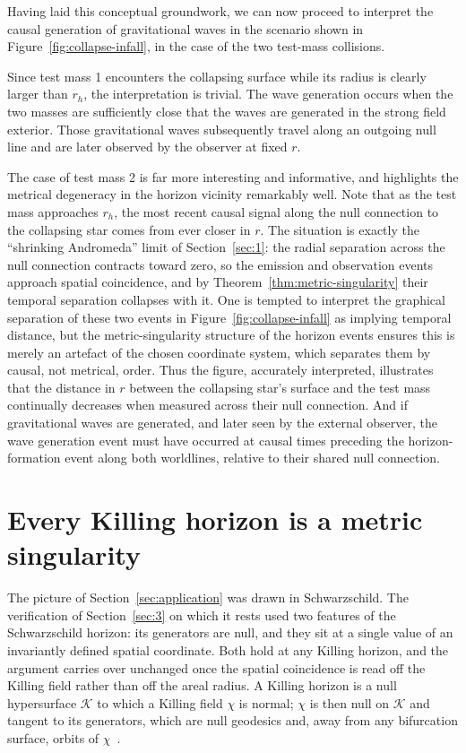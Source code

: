 \documentclass[11pt,a4paper]{article}
\theoremstyle{plain}
\theoremstyle{remark}
\begin{document}
Having laid this conceptual groundwork, we can now proceed to interpret the causal generation of gravitational waves in the scenario shown in Figure~\ref{fig:collapse-infall}, in the case of the two test-mass collisions.

Since test mass 1 encounters the collapsing surface while its radius is clearly larger than $r_h$, the interpretation is trivial. The wave generation occurs when the two masses are sufficiently close that the waves are generated in the strong field exterior. Those gravitational waves subsequently travel along an outgoing null line and are later observed by the observer at fixed $r$.

The case of test mass 2 is far more interesting and informative, and highlights the metrical degeneracy in the horizon vicinity remarkably well. Note that as the test mass approaches $r_h$, the most recent causal signal along the null connection to the collapsing star comes from ever closer in $r$. The situation is exactly the ``shrinking Andromeda'' limit of Section~\ref{sec:1}: the radial separation across the null connection contracts toward zero, so the emission and observation events approach spatial coincidence, and by Theorem~\ref{thm:metric-singularity} their temporal separation collapses with it. One is tempted to interpret the graphical separation of these two events in Figure~\ref{fig:collapse-infall} as implying temporal distance, but the metric-singularity structure of the horizon events ensures this is merely an artefact of the chosen coordinate system, which separates them by causal, not metrical, order. Thus the figure, accurately interpreted, illustrates that the distance in $r$ between the collapsing star's surface and the test mass continually decreases when measured across their null connection. And if gravitational waves are generated, and later seen by the external observer, the wave generation event must have occurred at causal times preceding the horizon-formation event along both worldlines, relative to their shared null connection.

\section{Every Killing horizon is a metric singularity}\label{sec:killing}

The picture of Section~\ref{sec:application} was drawn in Schwarzschild. The verification of Section~\ref{sec:3} on which it rests used two features of the Schwarzschild horizon: its generators are null, and they sit at a single value of an invariantly defined spatial coordinate. Both hold at any Killing horizon, and the argument carries over unchanged once the spatial coincidence is read off the Killing field rather than off the areal radius. A Killing horizon is a null hypersurface $\mathcal{K}$ to which a Killing field $\chi$ is normal; $\chi$ is then null on $\mathcal{K}$ and tangent to its generators, which are null geodesics and, away from any bifurcation surface, orbits of $\chi$~\cite{Hawking1973,Wald1984}.
\end{document}
